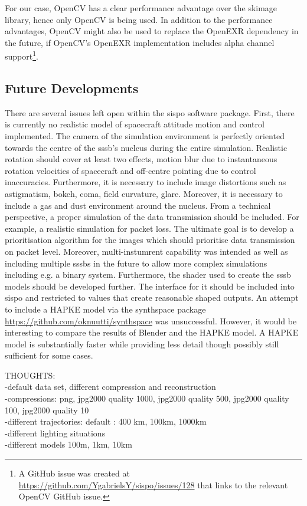 For our case, OpenCV has a clear performance advantage over the \gls{skimage} library, hence only OpenCV is being used. In addition to the performance advantages, OpenCV might also be used to replace the OpenEXR dependency in the future, if OpenCV's OpenEXR implementation includes alpha channel support\footnote{A GitHub issue was created at \url{https://github.com/YgabrielsY/sispo/issues/128} that links to the relevant OpenCV GitHub issue.}.

\subsection{Future Developments}
There are several issues left open within the \gls{sispo} software package. First, there is currently no realistic model of spacecraft attitude motion and control implemented. The camera of the simulation environment is perfectly oriented towards the centre of the \gls{sssb}'s nucleus during the entire simulation. Realistic rotation should cover at least two effects, motion blur due to instantaneous rotation velocities of spacecraft and off-centre pointing due to control inaccuracies. Furthermore, it is necessary to include  image distortions such as astigmatism, bokeh, coma, field curvature, glare. Moreover, it is necessary to include a gas and dust environment around the nucleus. From a technical perspective, a proper simulation of the data transmission should be included. For example, a realistic simulation for packet loss. The ultimate goal is to develop a prioritisation algorithm for the images which should prioritise data transmission on packet level.
Moreover, multi-instumrent capability was intended as well as including multiple \gls{sssb}s in the future to allow more complex simulations including e.g. a binary system.
Furthermore, the shader used to create the \gls{sssb} models should be developed further. The interface for it should be included into \gls{sispo} and restricted to values that create reasonable shaped outputs.
An attempt to include a HAPKE model via the synthspace package \url{https://github.com/oknuutti/synthspace} was unsuccessful. However, it would be interesting to compare the results of Blender and the HAPKE model. A HAPKE model is substantially faster while providing less detail though possibly still sufficient for some cases.

THOUGHTS:\\
-default data set, different compression and reconstruction\\
    -compressions: png, jpg2000 quality 1000, jpg2000 quality 500, jpg2000 quality 100, jpg2000 quality 10\\
-different trajectories: default : 400 km, 100km, 1000km\\
-different lighting situations\\
-different models 100m, 1km, 10km